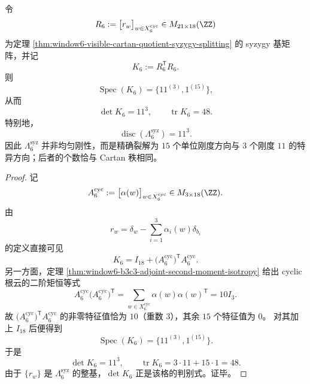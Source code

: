 \begin{theorem}\label{thm:window6-syzygy-gram-spectrum-discriminant}
令
\[
R_6:=\bigl[r_w\bigr]_{w\in X_6^{\mathrm{cyc}}}\in M_{21\times 18}(\ZZ)
\]
为定理 \ref{thm:window6-visible-cartan-quotient-syzygy-splitting} 的 syzygy 基矩阵，并记
\[
K_6:=R_6^{\mathsf T}R_6.
\]
则
\[
\operatorname{Spec}(K_6)=\{11^{(3)},1^{(15)}\},
\]
从而
\[
\det K_6=11^3,
\qquad
\operatorname{tr}K_6=48.
\]
特别地，
\[
\operatorname{disc}(\Lambda_6^{\mathrm{syz}})=11^3.
\]
因此 \(\Lambda_6^{\mathrm{syz}}\) 并非均匀刚性，而是精确裂解为 \(15\) 个单位刚度方向与 \(3\) 个刚度 \(11\) 的特异方向；后者的个数恰与 Cartan 秩相同。
\end{theorem}
\begin{proof}
记
\[
A_6^{\mathrm{cyc}}
:=
\bigl[\alpha(w)\bigr]_{w\in X_6^{\mathrm{cyc}}}
\in M_{3\times 18}(\ZZ).
\]
由
\[
r_w=\delta_w-\sum_{i=1}^{3}\alpha_i(w)\delta_{b_i}
\]
的定义直接可见
\[
K_6=I_{18}+\bigl(A_6^{\mathrm{cyc}}\bigr)^{\mathsf T}A_6^{\mathrm{cyc}}.
\]
另一方面，定理 \ref{thm:window6-b3c3-adjoint-second-moment-isotropy} 给出 cyclic 根云的二阶矩恒等式
\[
A_6^{\mathrm{cyc}}\bigl(A_6^{\mathrm{cyc}}\bigr)^{\mathsf T}
=
\sum_{w\in X_6^{\mathrm{cyc}}}\alpha(w)\alpha(w)^{\mathsf T}
=
10I_3.
\]
故 \(\bigl(A_6^{\mathrm{cyc}}\bigr)^{\mathsf T}A_6^{\mathrm{cyc}}\) 的非零特征值恰为 \(10\)（重数 \(3\)），其余 \(15\) 个特征值为 \(0\)。
对其加上 \(I_{18}\) 后便得到
\[
\operatorname{Spec}(K_6)=\{11^{(3)},1^{(15)}\}.
\]
于是
\[
\det K_6=11^3,
\qquad
\operatorname{tr}K_6=3\cdot 11+15\cdot 1=48.
\]
由于 \(\{r_w\}\) 是 \(\Lambda_6^{\mathrm{syz}}\) 的整基，\(\det K_6\) 正是该格的判别式。证毕。
\end{proof}

